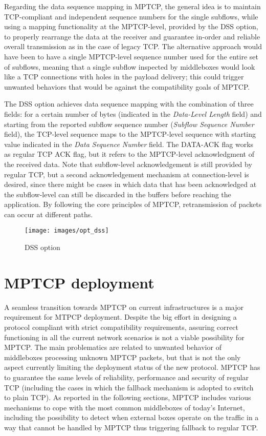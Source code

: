 Regarding the data sequence mapping in MPTCP, the general idea is to maintain TCP-compliant and independent sequence numbers for the single subflows, while using a mapping functionality at the MPTCP-level, provided by the DSS option, to properly rearrange the data at the receiver and guarantee in-order and reliable overall transmission as in the case of legacy TCP. The alternative approach would have been to have a single MPTCP-level sequence number used for the entire set of subflows, meaning that a single subflow inspected by middleboxes would look like a TCP connections with holes in the payload delivery; this could trigger unwanted behaviors that would be against the compatibility goals of MPTCP.

The DSS option achieves data sequence mapping with the combination of three fields: for a certain number of bytes (indicated in the \textit{Data-Level Length} field) and starting from the reported subflow sequence number (\textit{Subflow Sequence Number} field), the TCP-level sequence maps to the MPTCP-level sequence with starting value indicated in the \textit{Data Sequence Number} field.
The DATA-ACK flag works as regular TCP ACK flag, but it refers to the MPTCP-level acknowledgment of the received data. Note that subflow-level acknowledgement is still provided by regular TCP, but a second acknowledgement mechanism at connection-level is desired, since there might be cases in which data that has been acknowledged at the subflow-level can still be discarded in the buffers before reaching the application. By following the core principles of MPTCP, retransmission of packets can occur at different paths.

\begin{figure}[!htb]
\centering
\texttt{[image: images/opt\_dss]}
\caption{DSS option}
\label{fig:opt_dss}
\end{figure}

\section{MPTCP deployment}
A seamless transition towards MPTCP on current infrastructures is a major requirement for MTPCP deployment.
Despite the big effort in designing a protocol compliant with strict compatibility requirements, assuring correct functioning in all the current network scenarios is not a viable possibility for MPTCP. The main problematics are related to unwanted behavior of middleboxes processing unknown MPTCP packets, but that is not the only aspect currently limiting the deployment status of the new protocol. MPTCP has to guarantee the same levels of reliability, performance and security of regular TCP (including the cases in which the fallback mechanism is adopted to switch to plain TCP). 
As reported in the following sections, MPTCP includes various mechanisms to cope with the most common middleboxes of today's Internet, including the possibility to detect when external boxes operate on the traffic in a way that cannot be handled by MPTCP thus triggering fallback to regular TCP.

